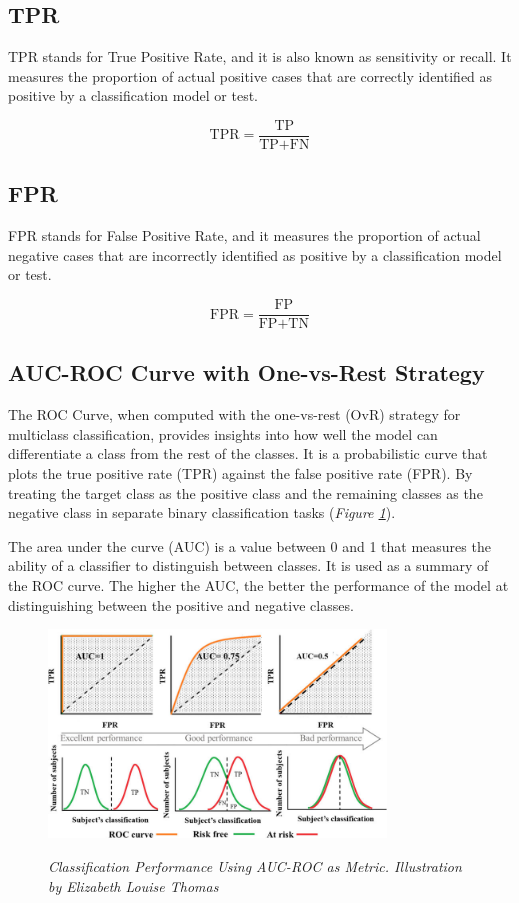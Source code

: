 \subsection{TPR}

TPR stands for True Positive Rate, and it is also known as sensitivity or
recall. It measures the proportion of actual positive cases that are correctly
identified as positive by a classification model or test.

\[
  \text{TPR} = \frac{\text{TP}}{\text{TP} + \text{FN}}
\]

\subsection{FPR}

FPR stands for False Positive Rate, and it measures the proportion of actual
negative cases that are incorrectly identified as positive by a classification
model or test.

\[ \text{FPR} = \frac{\text{FP}}{\text{FP} + \text{TN}} \]

\subsection{AUC-ROC Curve with One-vs-Rest Strategy}

The ROC Curve, when computed with the one-vs-rest (OvR) strategy for multiclass
classification, provides insights into how well the model can differentiate a
class from the rest of the classes. It is a probabilistic curve that plots the
true positive rate (TPR) against the false positive rate (FPR). By treating the
target class as the positive class and the remaining classes as the negative
class in separate binary classification tasks (\textit{Figure
\ref{fig:auc-roc}}). \newline

The area under the curve (AUC) is a value between 0 and 1 that measures the
ability of a classifier to distinguish between classes. It is used as a summary
of the ROC curve. The higher the AUC, the better the performance of the model
at distinguishing between the positive and negative classes.

\newpage

\begin{figure}[H]
  \centering
  \includegraphics[width=0.8\textwidth]{imatges/preliminaries/auc.png}
  \caption[Classification Performance Using AUC-ROC as Metric]{\textit{Classification Performance Using AUC-ROC as Metric. Illustration by Elizabeth Louise Thomas}}
  {\label{fig:auc-roc}}
\end{figure}


